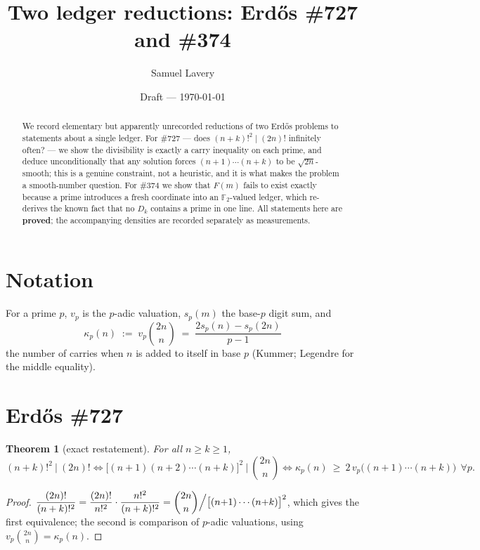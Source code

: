 \documentclass[11pt]{article}
\title{Two ledger reductions: Erd\H{o}s \#727 and \#374}
\author{Samuel Lavery}
\date{Draft --- \today}
\newtheorem{theorem}{Theorem}
\begin{document}
\maketitle

\begin{abstract}
We record elementary but apparently unrecorded reductions of two Erd\H{o}s problems to
statements about a single ledger.  For \#727 --- does $(n+k)!^2\mid(2n)!$ infinitely
often? --- we show the divisibility is exactly a carry inequality on each prime, and deduce
unconditionally that any solution forces $(n+1)\cdots(n+k)$ to be $\sqrt{2n}$-smooth; this
is a genuine constraint, not a heuristic, and it is what makes the problem a smooth-number
question.  For \#374 we show that $F(m)$ fails to exist exactly because a prime introduces a
fresh coordinate into an $\mathbb F_2$-valued ledger, which re-derives the known fact that
no $D_k$ contains a prime in one line.  All statements here are \textbf{proved}; the
accompanying densities are recorded separately as measurements.
\end{abstract}

\section{Notation}

For a prime $p$, $v_p$ is the $p$-adic valuation, $s_p(m)$ the base-$p$ digit sum, and
\[
  \kappa_p(n)\;:=\;v_p\binom{2n}{n}\;=\;\frac{2s_p(n)-s_p(2n)}{p-1}
\]
the number of carries when $n$ is added to itself in base $p$ (Kummer; Legendre for the
middle equality).

\section{Erd\H{o}s \#727}

\begin{theorem}[exact restatement]\label{thm:727restate}
For all $n\ge k\ge1$,
\[
  (n+k)!^2\ \Big|\ (2n)!
  \iff
  \bigl[(n{+}1)(n{+}2)\cdots(n{+}k)\bigr]^2\ \Big|\ \binom{2n}{n}
  \iff
  \kappa_p(n)\ \ge\ 2\,v_p\bigl((n{+}1)\cdots(n{+}k)\bigr)\ \ \forall p .
\]
\end{theorem}

\begin{proof}
$\dfrac{(2n)!}{(n+k)!^2}=\dfrac{(2n)!}{n!^2}\cdot\dfrac{n!^2}{(n+k)!^2}
=\dbinom{2n}{n}\Big/\bigl[(n{+}1)\cdots(n{+}k)\bigr]^2$, which gives the first equivalence;
the second is comparison of $p$-adic valuations, using $v_p\binom{2n}{n}=\kappa_p(n)$.
\end{proof}
\end{document}
